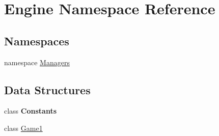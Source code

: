 \hypertarget{a00015}{}\section{Engine Namespace Reference}
\label{a00015}
\subsection*{Namespaces}
\begin{DoxyCompactItemize}
\item 
namespace \hyperlink{a00014}{Managers}
\end{DoxyCompactItemize}
\subsection*{Data Structures}
\begin{DoxyCompactItemize}
\item 
class {\bfseries Constants}
\item 
class \hyperlink{a00040}{Game1}
\end{DoxyCompactItemize}
